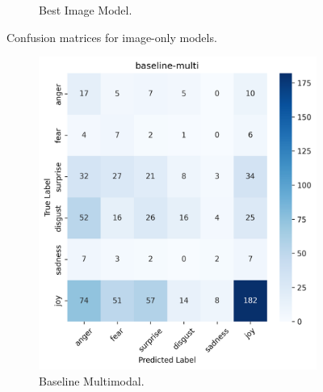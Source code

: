 \begin{figure}[h]
\begin{subfigure}[b]{0.48\textwidth}
        \caption{Best Image Model.}
        \label{fig:image-confusion-best}
    \end{subfigure}
    \caption{Confusion matrices for image-only models.}
    \label{fig:image-confusion}
\end{figure}

\begin{figure}[h]
    \centering
    \begin{subfigure}[b]{0.48\textwidth}
        \includegraphics[width=\textwidth]{images/confusion_matrix_baseline_multi_dist.png}
        \caption{Baseline Multimodal.}
        \label{fig:multi-confusion-baseline}
    \end{subfigure}
    \hfill
    \begin{subfigure}[b]{0.48\textwidth}

\end{subfigure}
\end{figure}
